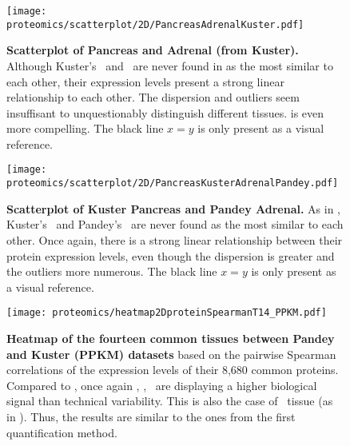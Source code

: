\begin{figure}[!htpb]
    \texttt{[image: proteomics/scatterplot/2D/PancreasAdrenalKuster.pdf]}\centering
    \caption[Kuster: Pancreas vs Adrenal]{\label{fig:scat2DAdrenalPancreasKuster}\textbf{%
    Scatterplot of Pancreas and Adrenal (from Kuster).}
    Although Kuster's \Pancreas\ and \Adrenal\ are never found
    in 
    as the most similar to each other,
    their expression levels present a strong linear relationship to each other.
    The dispersion and outliers seem insuffisant
    to unquestionably distinguish different tissues.
     is even more compelling.
    {\small The black line $x=y$ is only present as a visual reference.}}
\end{figure}


\begin{figure}[!htpb]
    \texttt{[image: proteomics/scatterplot/2D/PancreasKusterAdrenalPandey.pdf]}\centering
    \caption[Kuster Pancreas vs Pandey Adrenal]{\label{fig:scat2DAdrenalPandeyPancreasKuster}\textbf{%
    Scatterplot of Kuster Pancreas and Pandey Adrenal.}
    As in ,
    Kuster's \pancreas\ and Pandey's \adrenal\ are never found as the most similar
    to each other.
    Once again,
    there is a strong linear relationship between their protein expression levels,
    even though the dispersion is greater and the outliers more numerous.
    {\small The black line $x=y$ is only present as a visual reference.}}
\end{figure}


\begin{figure}[!htpb]
    \texttt{[image: proteomics/heatmap2DproteinSpearmanT14\_PPKM.pdf]}\centering
    \caption[Heatmap of the 14 common tissues between Pandey and Kuster
    (Spearman correlation --- PPKM)]{\label{fig:heatmap3DProtT14PPKM}\textbf{Heatmap
    of the fourteen common tissues between Pandey and Kuster (PPKM) datasets}
    based on the pairwise Spearman correlations of the expression levels of
    their 8,680 common proteins.
    Compared to ,
    once again \Placenta, \Lung, \Kidney\ are displaying a higher biological signal
    than technical variability.
    This is also the case of \Adrenal\ tissue (as in ).
    Thus, the results are similar to the ones from the first quantification method.}
\end{figure}
